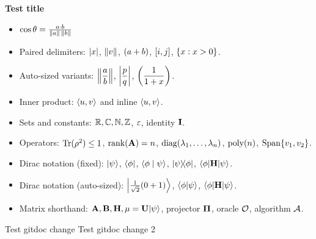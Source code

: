 \documentclass[12pt]{article} %
\begin{document}
\begin{center}
    {\textbf{Test title}\\}
\end{center}
\begin{itemize}[topsep=-3pt, itemsep = -1pt]
    \item $\cos{\theta} = \frac{a \cdot b}{\norm{a}\,\norm{b}}$
\end{itemize}


\separate


\begin{itemize}[topsep=-3pt, itemsep=-1pt]
    \item Paired delimiters: $\abs{x}$, $\norm{v}$, $\parens{a+b}$, $\bracks{i,j}$, $\braces{x : x > 0}$.
    \item Auto-sized variants: $\Norm{\dfrac{a}{b}}$, $\Abs{\dfrac{p}{q}}$, $\Par{\dfrac{1}{1+x}}$.
    \item Inner product: $\inprod{u}{v}$ and inline $\inprods{u}{v}$.
    \item Sets and constants: $\R, \C, \N, \Z$, $\eps$, identity $\id$.
    \item Operators: $\Tr(\rho^2) \le 1$, $\rank(\ma) = n$, $\diagop(\lambda_1,\ldots,\lambda_n)$, $\poly(n)$, $\Span\{v_1, v_2\}$.
    \item Dirac notation (fixed): $\ket{\psi}$, $\bra{\phi}$, $\braket{\phi}{\psi}$, $\ketbra{\psi}{\phi}$, $\mel{\phi}{\mh}{\psi}$.
    \item Dirac notation (auto-sized): $\Ket{\tfrac{1}{\sqrt{2}}(0 + 1)}$, $\Braket{\phi}{\psi}$, $\Mel{\phi}{\mh}{\psi}$.
    \item Matrix shorthand: $\ma, \mb, \mh, \mu = \mmu \ket{\psi}$, projector $\mproj$, oracle $\oracle$, algorithm $\alg$.
\end{itemize}


\separate

Test gitdoc change 
Test gitdoc change  2




\printbibliography
\end{document}
